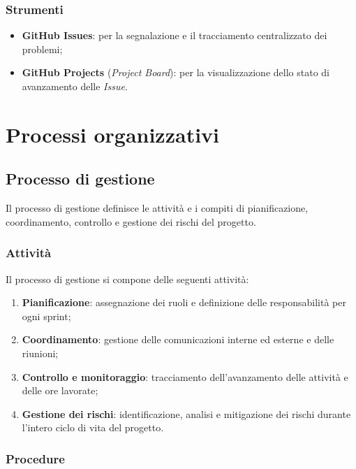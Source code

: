 \documentclass[10pt, letterpaper]{article}
\begin{document}
\subsubsection{Strumenti}
\begin{itemize}
    \item \textbf{GitHub Issues}: per la segnalazione e il tracciamento centralizzato dei problemi;
    \item \textbf{GitHub Projects} (\textit{Project Board}): per la visualizzazione dello stato di avanzamento delle \textit{Issue}.
\end{itemize}


\section{Processi organizzativi}

\subsection{Processo di gestione}
Il processo di gestione definisce le attività e i compiti di pianificazione, coordinamento, controllo e gestione dei rischi del progetto.

\subsubsection{Attività}
Il processo di gestione si compone delle seguenti attività:
\begin{enumerate}
    \item \textbf{Pianificazione}: assegnazione dei ruoli e definizione delle responsabilità per ogni sprint;
    \item \textbf{Coordinamento}: gestione delle comunicazioni interne ed esterne e delle riunioni;
    \item \textbf{Controllo e monitoraggio}: tracciamento dell'avanzamento delle attività e delle ore lavorate;
    \item \textbf{Gestione dei rischi}: identificazione, analisi e mitigazione dei rischi durante l'intero ciclo di vita del progetto.
\end{enumerate}

\subsubsection{Procedure}
\end{document}
